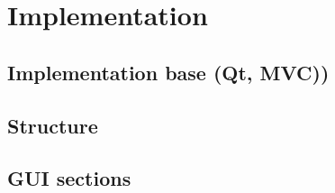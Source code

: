 \chapter{Implementation}
\label{implementation}

	
\section{Implementation base (Qt, MVC))}


\section{Structure}

	
\section{GUI sections}

